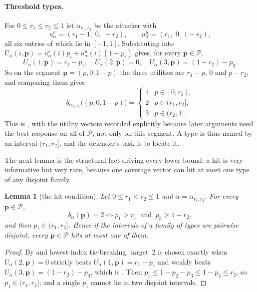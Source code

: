 \documentclass[letterpaper,9pt,twocolumn]{extarticle}
\newcommand{\pvec}{\mathbf{p}}
\newcommand{\cP}{\mathcal{P}}
\theoremstyle{plain}
\newtheorem{lemma}[theorem]{Lemma}
\theoremstyle{definition}
\theoremstyle{remark}
\begin{document}
\paragraph{Threshold types.}
For $0\le r_1\le r_2\le 1$ let $\alpha_{r_1,r_2}$ be the attacker with
\begin{equation}
u^c_{\alpha}=(r_1-1,\;0,\;-r_2),\qquad
u^u_{\alpha}=(r_1,\;0,\;1-r_2),
\label{eq:type-utils}
\end{equation}
all six entries of which lie in $[-1,1]$. Substituting into
$U_\alpha(i,\pvec)=u^c_\alpha(i)p_i+u^u_\alpha(i)(1-p_i)$ gives, for every
$\pvec\in\cP$,
\begin{equation}
U_\alpha(1,\pvec)=r_1-p_1,\quad U_\alpha(2,\pvec)=0,\quad
U_\alpha(3,\pvec)=(1-r_2)-p_3 .
\label{eq:type-U}
\end{equation}
So on the segment $\pvec=(p,0,1-p)$ the three utilities are $r_1-p$, $0$ and
$p-r_2$, and comparing them gives
\begin{equation}
b_{\alpha_{r_1,r_2}}\bigl((p,0,1-p)\bigr)=
\begin{cases}
1 & p\in[0,r_1],\\
2 & p\in(r_1,r_2],\\
3 & p\in(r_2,1].
\end{cases}
\label{eq:type-line}
\end{equation}
This is \citet[Lemma 7.2]{balcan2015}, with the utility vectors recorded
explicitly because later arguments need the best response on all of $\cP$,
not only on this segment. A type is thus named by an interval
$(r_1,r_2]$, and the defender's task is to locate it.

The next lemma is the structural fact driving every lower bound: a hit is
very informative but very rare, because one coverage vector can hit at most
one type of any disjoint family.

\begin{lemma}[the hit condition]
\label{lem:hit}
Let $0\le r_1<r_2\le 1$ and $\alpha=\alpha_{r_1,r_2}$. For every $\pvec\in\cP$,
\begin{equation}
b_\alpha(\pvec)=2
\iff
p_1>r_1\ \text{ and }\ p_3\ge 1-r_2 ,
\label{eq:hit-iff}
\end{equation}
and then $p_1\in(r_1,r_2]$. Hence if the intervals of a family of types are
pairwise disjoint, every $\pvec\in\cP$ hits \emph{at most one} of them.
\end{lemma}

\begin{proof}
By  and lowest-index tie-breaking, target~$2$ is chosen
exactly when $U_\alpha(2,\pvec)=0$ strictly beats $U_\alpha(1,\pvec)=r_1-p_1$
and weakly beats $U_\alpha(3,\pvec)=(1-r_2)-p_3$, which is
. Then $p_1\le 1-p_2-p_3\le 1-p_3\le r_2$, so
$p_1\in(r_1,r_2]$; and a single $p_1$ cannot lie in two disjoint intervals.
\end{proof}
\end{document}
